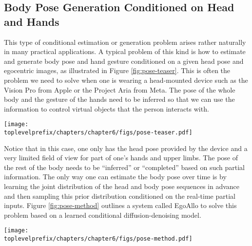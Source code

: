 \documentclass[../../book-main.tex]{subfiles}
\begin{document}
\subsection{Body Pose Generation Conditioned on Head and Hands}\label{sub:ego-allo}
This type of
conditional estimation or generation problem arises rather naturally in many
practical applications. 
A typical problem of this kind is how to estimate and generate body pose and hand gesture conditioned on a given head pose and egocentric images, as illustrated in Figure \ref{fig:pose-teaser}. This is often the problem we need to solve when one is wearing a head-mounted device such as the Vision Pro from Apple or the Project Aria from Meta. The pose of the whole body and the gesture of the hands need to be inferred so that we can use the information to control virtual objects that the person interacts with.
\begin{figure*}[t]
  \centering
  \texttt{[image: \\toplevelprefix/chapters/chapter6/figs/pose-teaser.pdf]}
    \caption{
A system that estimates human body height, pose, and hand parameters (middle), conditioned on egocentric SLAM poses and images (left). Outputs capture the wearer's actions in the allocentric reference frame of the scene, which we visualize here with 3D reconstructions (right).
  }
  \label{fig:pose-teaser}

\end{figure*}

Notice that in this case, one only has the head pose provided by the device and a very limited field of view for part of one's hands and upper limbs. The pose of the rest of the body needs to be ``inferred'' or ``completed'' based on such partial information. The only way one can estimate the body pose over time is by learning the joint distribution of the head and body pose sequences in advance and then sampling this prior distribution conditioned on the real-time partial inputs. Figure \ref{fig:pose-method} outlines a system called EgoAllo \cite{yi2024egoallo} to solve this problem based on a learned conditional diffusion-denoising model. 
\begin{figure*}[t]
  \centering
  \texttt{[image: \\toplevelprefix/chapters/chapter6/figs/pose-method.pdf]}
\caption{
    \textbf{Overview of technical components of EgoAllo \cite{yi2024egoallo}.}
    A diffusion model is pretrained that can generate body pose sequence based on local body parameters (middle).
    An invariant parameterization $g(\cdot)$ of SLAM poses (left) is used to condition the diffusion model. These can be placed into the global coordinate frame via global alignment to input poses.
    When available, egocentric video is used for hand detection (left) via HaMeR~\cite{pavlakos2023reconstructing}, which can be incorporated into samples via guidance by the generated gesture.
  }
  \label{fig:pose-method}
\end{figure*}
\end{document}
